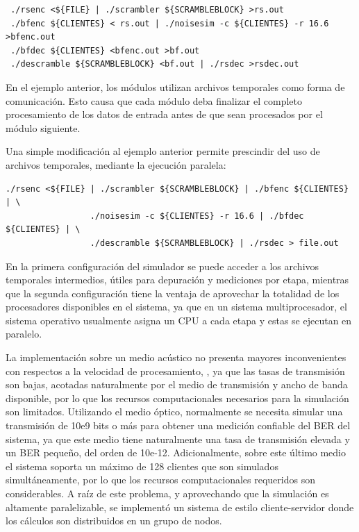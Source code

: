 \small
\begin{verbatim}
 ./rsenc <${FILE} | ./scrambler ${SCRAMBLEBLOCK} >rs.out
 ./bfenc ${CLIENTES} < rs.out | ./noisesim -c ${CLIENTES} -r 16.6 >bfenc.out
 ./bfdec ${CLIENTES} <bfenc.out >bf.out
 ./descramble ${SCRAMBLEBLOCK} <bf.out | ./rsdec >rsdec.out
\end{verbatim}
\normalsize

En el ejemplo anterior, los módulos utilizan archivos temporales como forma de comunicación. Esto causa que cada módulo deba finalizar el completo procesamiento de los datos de entrada antes de que sean procesados por el módulo siguiente.

Una simple modificación al ejemplo anterior permite prescindir del uso de archivos temporales, mediante la ejecución paralela:
\small
\begin{verbatim}
./rsenc <${FILE} | ./scrambler ${SCRAMBLEBLOCK} | ./bfenc ${CLIENTES} | \
                 ./noisesim -c ${CLIENTES} -r 16.6 | ./bfdec ${CLIENTES} | \ 
                 ./descramble ${SCRAMBLEBLOCK} | ./rsdec > file.out
\end{verbatim}
\normalsize

En la primera configuración del simulador se puede acceder a los archivos temporales intermedios, útiles para depuración y mediciones por etapa, mientras que la segunda configuración tiene la ventaja de aprovechar la totalidad de los procesadores disponibles en el sistema, ya que en un sistema multiprocesador, el sistema operativo usualmente asigna un CPU a cada etapa y estas se ejecutan en paralelo.

La implementación sobre un medio acústico no presenta mayores inconvenientes con respectos a la velocidad de procesamiento, , ya que las tasas de transmisión son bajas, acotadas naturalmente por el medio de transmisión y ancho de banda disponible, por lo que los recursos computacionales necesarios para la simulación son limitados. 
Utilizando el medio óptico, normalmente se necesita simular una transmisión de 10e9 bits o más para obtener una medición confiable del BER del sistema, ya que este medio tiene naturalmente una tasa de transmisión elevada y un BER pequeño, del orden de 10e-12. Adicionalmente, sobre este último medio el sistema soporta un máximo de 128 clientes que son simulados simultáneamente, por lo que los recursos computacionales requeridos son considerables. A raíz de este problema, y aprovechando que la simulación es altamente paralelizable, se implementó un sistema de estilo cliente-servidor donde los cálculos son distribuidos en un grupo de nodos.

